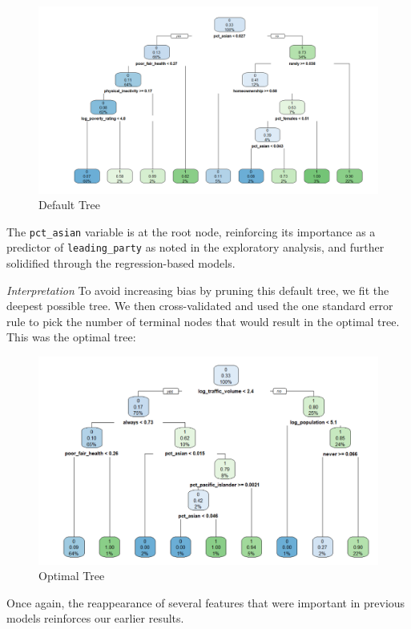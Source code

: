 \documentclass[
]{article}
\begin{document}
\begin{figure}

{\centering \includegraphics[width=0.8\linewidth]{../results/default-tree} 

}

\caption{Default Tree}\label{fig:default-tree}
\end{figure}

The \texttt{pct\_asian} variable is at the root node, reinforcing its importance as a predictor of \texttt{leading\_party} as noted in the exploratory analysis, and further solidified through the regression-based models.

\emph{Interpretation}
To avoid increasing bias by pruning this default tree, we fit the deepest possible tree. We then cross-validated and used the one standard error rule to pick the number of terminal nodes that would result in the optimal tree. This was the optimal tree:

\begin{figure}

{\centering \includegraphics[width=0.8\linewidth]{../results/optimal-tree-plot} 

}

\caption{Optimal Tree}\label{fig:optimal-tree}
\end{figure}

Once again, the reappearance of several features that were important in previous models reinforces our earlier results.
\end{document}
